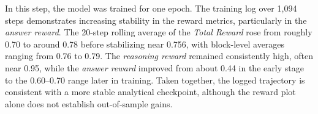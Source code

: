 In this step, the model was trained for one epoch. The training log over 1,094 steps demonstrates increasing stability in the reward metrics, particularly in the \textit{answer reward}. The 20-step rolling average of the \textit{Total Reward} rose from roughly 0.70 to around 0.78 before stabilizing near 0.756, with block-level averages ranging from 0.76 to 0.79. The \textit{reasoning reward} remained consistently high, often near 0.95, while the \textit{answer reward} improved from about 0.44 in the early stage to the 0.60--0.70 range later in training. Taken together, the logged trajectory is consistent with a more stable analytical checkpoint, although the reward plot alone does not establish out-of-sample gains.



% 




